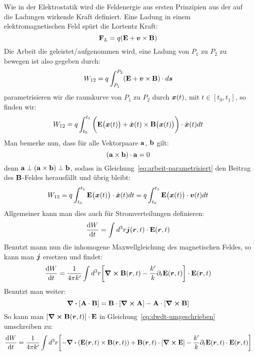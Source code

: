 Wie in der Elektrostatik wird die Feldenergie aus ersten Prinzipien aus der auf die Ladungen wirkende Kraft definiert. Eine Ladung in einem elektromagnetischen Feld spürt die Lortentz Kraft:
\begin{equation}
  \vb F_L = q \qty(\vb E + \vb*v\times\vb B)
\end{equation}
Die Arbeit die geleistet/aufgenommen wird, eine Ladung von $P_1$ zu $P_2$ zu bewegen ist also gegeben durch:
\begin{equation}
  W_{12} = q\int_{P_1}^{P_2} (\vb E + \vb*v\times\vb B)\cdot d\vb*s
\end{equation}
parametrisieren wir die raumkurve von $P_1$ zu $P_2$ durch $\vb*x(t)$, mit $t\in[t_0, t_1]$, so finden wir:
\begin{equation}\label{eq:arbeit-parametrisiert}
  W_{12} = q\int_{t_0}^{t_1} \bigg(\vb E\big(\vb*x(t)\big) + \dot{\vb*x}(t)\times\vb B\big(\vb*x(t)\big)\bigg)\cdot\dot{\vb*x}(t)dt
\end{equation}
Man bemerke nun, dass für alle Vektorpaare $\vb a$, $\vb b$ gilt:
\begin{equation*}
  (\vb a\times \vb b)\cdot \vb a = 0
\end{equation*}
denn $\vb a \perp \vb (\vb a \times \vb b)\perp \vb b$,
sodass in Gleichung~\ref{eq:arbeit-parametrisiert} den Beitrag des $\vb B$-Feldes herausfällt und übrig bleibt:
\begin{equation}
  W_{12} = q\int_{t_0}^{t_1} \vb E\big(\vb*x(t)\big)\cdot\dot{\vb*x}(t)dt
  = q\int_{t_0}^{t_1} \vb E\big(\vb*x(t)\big)\cdot{\vb*v}(t)dt
\end{equation}
Allgemeiner kann man dies auch für Stromverteilungen definieren:
\begin{equation}
  \dv{W}{t} = \int d^3r \vb*j(\vb*r, t)\cdot\vb E(\vb*r, t)
\end{equation}
Benutzt mann nun die inhomogene Maxwellgleichung des magnetischen Feldes, so kann man $\vb*j$ ersetzen und findet:
\begin{equation}\label{eq:dwdt-umgeschrieben}
  \dv{W}{t} = \frac{1}{4\pi k'} \int d^3r \qty[\curl \vb B(\vb*r, t) - \frac{k'}{k}\partial_t \vb E(\vb*r, t)]\cdot\vb E(\vb*r, t)
\end{equation}
Benutzt man weiter:
\begin{equation*}
  \div \qty[\vb A \cdot \vb B] = \vb B \cdot [\curl \vb A] - \vb A \cdot \qty[\curl \vb B]
\end{equation*}
So kann man $\qty[\curl \vb B(\vb*r, t)]\cdot \vb E$ in Gleichung~\ref{eq:dwdt-umgeschrieben} umschreiben zu:
\begin{equation}
  \dv{W}{t} = \frac{1}{4\pi k'} \int d^3r \qty[-\div\qty(\vb E(\vb*r, t)\times\vb B(\vb*r, t))+\vb B(\vb*r, t)\cdot\qty[\curl\vb E] - \frac{k'}{k}\partial_t \vb E(\vb*r, t)\cdot\vb E(\vb*r, t)]
\end{equation}
